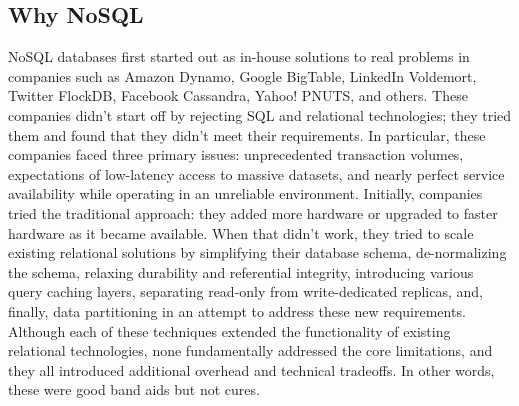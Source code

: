\subsection{Why NoSQL}
\hspace*{0.7in} NoSQL databases first started out as in-house solutions to real problems in companies such as Amazon Dynamo, Google BigTable, LinkedIn Voldemort, Twitter FlockDB, Facebook Cassandra, Yahoo! PNUTS, and others. These companies didn't start off by rejecting SQL and relational technologies; they tried them and found that they didn't meet their requirements. In particular, these companies faced three primary issues: unprecedented transaction volumes, expectations of low-latency access to massive datasets, and nearly perfect service availability while operating in an unreliable environment. Initially, companies tried the traditional approach: they added more hardware or upgraded to faster hardware as it became available. When that didn't work, they tried to scale existing relational solutions by simplifying their database schema, de-normalizing the schema, relaxing durability and referential integrity, introducing various query caching layers, separating read-only from write-dedicated replicas, and, finally, data partitioning in an attempt to address these new requirements. Although each of these techniques extended the functionality of existing relational technologies, none fundamentally addressed the core limitations, and they all introduced additional overhead and technical tradeoffs. In other words, these were good band aids but not cures.\cite{2}
\\
